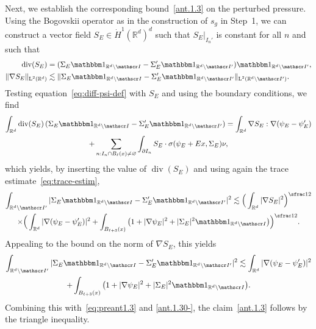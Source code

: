 \documentclass[JEP,XML,SOM,Unicode,published]{cedram}
\let\mathcal\mathscr
\let\mathds\mathbbm
\theoremstyle{plain}
\theoremstyle{definition}
\newcommand{\R}{\mathbb R}
\newcommand{\Ic}{\mathcal I}
\newcommand{\Ld}{\operatorname{L}}
\newcommand{\Div}{{\operatorname{div}}}
\begin{document}
Next, we establish the corresponding bound~\eqref{ant.1.3} on the perturbed pressure.
Using the Bogovskii operator as in the construction of $s_g$ in Step~1, we can construct a vector field $S_E\in\dot H^1(\R^d)^d$ such that
$S_E|_{I_n'}$ is constant for all $n$ and such that
\begin{align*}
\Div (S_E)&=(\Sigma_E\mathds1_{\R^d\setminus\Ic}-\Sigma_E'\mathds1_{\R^d\setminus\Ic'})\mathds1_{\R^d\setminus\Ic'},\\
\|\nabla S_E\|_{\Ld^2(\R^d)}&\lesssim \|\Sigma_E\mathds1_{\R^d\setminus\Ic}-\Sigma_E'\mathds1_{\R^d\setminus\Ic'}\|_{\Ld^2(\R^d\setminus\Ic')}.
\end{align*}
Testing equation~\eqref{eq:diff-psi-def} with $S_E$ and using the boundary conditions, we find
\begin{multline*}
\int_{\R^d}\Div(S_E)\,(\Sigma_E\mathds1_{\R^d\setminus\Ic}-\Sigma_E'\mathds1_{\R^d\setminus\Ic'})=\int_{\R^d}\nabla S_E:\nabla(\psi_E-\psi_E')\\
+\sum_{n:I_n\cap B_\ell(x)\ne\varnothing}\int_{\partial I_n}S_E\cdot\sigma(\psi_E+Ex,\Sigma_E)\nu,
\end{multline*}
which yields, by inserting the value of $\Div (S_E)$ and using again the trace estimate~\eqref{eq:trace-estim},
\begin{multline*}
\int_{\R^d\setminus\Ic'}|\Sigma_E\mathds1_{\R^d\setminus\Ic}-\Sigma_E'\mathds1_{\R^d\setminus\Ic'}|^2\lesssim\Big(\int_{\R^d}|\nabla S_E|^2\Big)^{\sfrac12}\\
\times\Big(\int_{\R^d}|\nabla(\psi_E-\psi_E')|^2+\int_{B_{\ell+3}(x)}\big(1+|\nabla\psi_E|^2+|\Sigma_E|^2\mathds1_{\R^d\setminus\Ic}\big)\Big)^{\sfrac12}.
\end{multline*}
Appealing to the bound on the norm of $\nabla S_E$, this yields
\begin{multline*}
\int_{\R^d\setminus\Ic'}|\Sigma_E\mathds1_{\R^d\setminus\Ic}-\Sigma_E'\mathds1_{\R^d\setminus\Ic'}|^2\lesssim 
\int_{\R^d}|\nabla(\psi_E-\psi_E')|^2\\
+\int_{B_{\ell+3}(x)}\big(1+|\nabla\psi_E|^2+|\Sigma_E|^2\mathds1_{\R^d\setminus\Ic}\big).
\end{multline*}
Combining this with~\eqref{eq:preant1.3} and \eqref{ant.1.30-}, the claim~\eqref{ant.1.3} follows by the triangle inequality.
\end{document}

